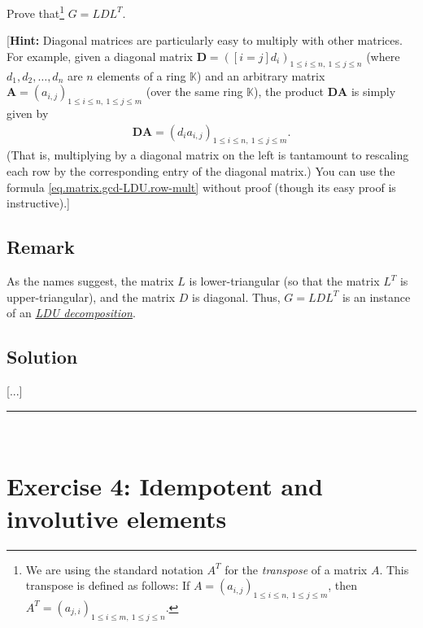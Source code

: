 \documentclass[paper=a4, fontsize=12pt]{scrartcl} %
\newcommand{\KK}{\mathbb{K}} %
\newcommand{\tup}[1]{\left( #1 \right)}
\newcommand{\ive}[1]{\left[ #1 \right]}
\newcommand{\horrule}[1]{\rule{\linewidth}{#1}} %
\theoremstyle{plainsl}
\theoremstyle{definition}
\theoremstyle{remark}
\begin{document}
Prove that\footnote{We are using the standard notation $A^T$ for
the \textit{transpose} of a matrix $A$. This transpose is defined
as follows:
If $A = \tup{ a_{i, j} }_{1 \leq i \leq n, \ 1 \leq j \leq m }$,
then
$A^T = \tup{ a_{j, i} }_{1 \leq i \leq m, \ 1 \leq j \leq n }$.}
$G = LDL^T$.

[\textbf{Hint:} Diagonal matrices are particularly easy
to multiply with other matrices. For example, given a
diagonal matrix
$\mathbf{D} = \tup{ \ive{i = j} d_i }_{1 \leq i \leq n, \ 1 \leq j \leq n }$
(where $d_1, d_2, \ldots, d_n$ are $n$ elements of a ring $\KK$)
and an arbitrary matrix
$\mathbf{A} = \tup{ a_{i, j} }_{1 \leq i \leq n, \ 1 \leq j \leq m }$
(over the same ring $\KK$),
the product $\mathbf{D} \mathbf{A}$ is simply given by
\begin{align}
 \mathbf{D} \mathbf{A} =
 \tup{ d_i a_{i, j} }_{1 \leq i \leq n, \ 1 \leq j \leq m } .
 \label{eq.matrix.gcd-LDU.row-mult}
\end{align}
(That is, multiplying by a diagonal matrix on the left is tantamount
to rescaling each row by the corresponding entry of the diagonal
matrix.)
You can use the formula \eqref{eq.matrix.gcd-LDU.row-mult} without
proof (though its easy proof is instructive).]

\subsection{Remark}

As the names suggest, the matrix $L$ is lower-triangular
(so that the matrix $L^T$ is upper-triangular),
and the matrix $D$ is diagonal.
Thus, $G = LDL^T$ is an instance of an
\href{https://en.wikipedia.org/wiki/LU_decomposition#LDU_decomposition}{\textit{LDU decomposition}}.

\subsection{Solution}

[...]

\horrule{0.3pt} \\[0.4cm]

\section{Exercise 4: Idempotent and involutive elements}
\end{document}
